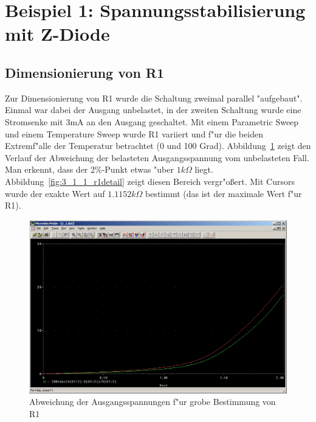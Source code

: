 \section{Beispiel 1: Spannungsstabilisierung mit Z-Diode}

\subsection{Dimensionierung von R1}

Zur Dimensionierung von R1 wurde die Schaltung zweimal parallel "aufgebaut". Einmal war dabei der Ausgang unbelastet, in der zweiten Schaltung wurde eine Stromsenke mit 3mA an den Ausgang geschaltet. Mit einem Parametric Sweep und einem Temperature Sweep wurde R1 variiert und f"ur die beiden Extremf"alle der Temperatur betrachtet (0 und 100 Grad).
Abbildung~\ref{fig:3_1_1_r1grob} zeigt den Verlauf der Abweichung der belasteten Ausgangsspannung vom unbelasteten Fall. Man erkennt, dass der 2\%-Punkt etwas "uber $1k\Omega$ liegt. Abbildung~\ref{fig:3_1_1_r1detail} zeigt diesen Bereich vergr"o\ss{}ert. Mit Cursors wurde der exakte Wert auf $1.1152k\Omega$ bestimmt (das ist der maximale Wert f"ur R1).

\begin{figure}%
	\centering
	\includegraphics[width=\textwidth]{fig/bsp1/3_1_1_r1grob.PNG}
	\caption{Abweichung der Ausgangsspannungen f"ur grobe Bestimmung von R1}
	\label{fig:3_1_1_r1grob}
\end{figure}

